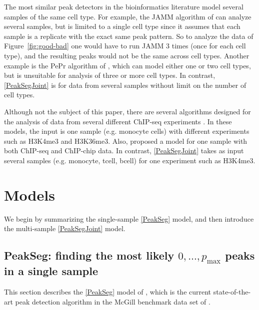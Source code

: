 \documentclass{article} %
\begin{document}
The most similar peak detectors in the bioinformatics literature model
several samples of the same cell type. For example, the JAMM algorithm
of \citet{JAMM} can analyze several samples, but is limited to a
single cell type since it assumes that each sample is a replicate with
the exact same peak pattern. So to analyze the data of
Figure~\ref{fig:good-bad} one would have to run JAMM 3 times (once for
each cell type), and the resulting peaks would not be the same across
cell types. Another example is the PePr algorithm of \citet{PePr},
which can model either one or two cell types, but is unsuitable for
analysis of three or more cell types. In contrast, \ref{PeakSegJoint}
is for data from several samples without limit on the number of cell
types.

Although not the subject of this paper, there are several algorithms
designed for the analysis of data from several different ChIP-seq
experiments \citep{chromhmm,segway,jmosaics}. In these models, the
input is one sample (e.g. monocyte cells) with different experiments
such as H3K4me3 and H3K36me3. Also,
\citet{hierarchical-joint} proposed a model for one sample with both
ChIP-seq and ChIP-chip data. In contrast, 
\ref{PeakSegJoint} takes as input several samples
(e.g. monocyte, tcell, bcell) for one experiment such as H3K4me3.

\section{Models}\label{sec:models}

We begin by summarizing the single-sample \ref{PeakSeg} model, and
then introduce the multi-sample \ref{PeakSegJoint} model.

\subsection{PeakSeg: finding the most likely $0,\dots,p_{\text{max}}$
  peaks in a single sample}

This section describes the \ref{PeakSeg} model of
\citet{HOCKING-PeakSeg}, which is the current state-of-the-art peak
detection algorithm in the McGill benchmark data set of
\citet{hocking2014visual}. 
\end{document}
